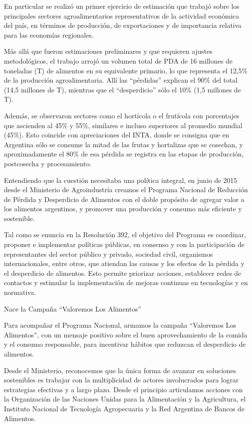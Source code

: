 En particular se realizó un primer ejercicio de estimación que trabajó
sobre los principales sectores agroalimentarios representativos de la
actividad económica del país, en términos de producción, de
exportaciones y de importancia relativa para las economías regionales.

Más allá que fueron estimaciones preliminares y que requieren ajustes
metodológicos, el trabajo arrojó un volumen total de PDA de 16 millones
de toneladas (T) de alimentos en su equivalente primario, lo que
representa el 12,5\% de la producción agroalimentaria. Allí las
``pérdidas'' explican el 90\% del total (14,5 millones de T), mientras
que el ``desperdicio'' sólo el 10\% (1,5 millones de T).

Además, se observaron sectores como el hortícola o el frutícola con
porcentajes que ascienden al 45\% y 55\%, similares e incluso superiores
al promedio mundial (45\%). Esto coincide con apreciaciones del INTA,
donde se consigna que en Argentina sólo se consume la mitad de las
frutas y hortalizas que se cosechan, y aproximadamente el 80\% de esa
pérdida se registra en las etapas de producción, postcosecha y
procesamiento.

Entendiendo que la cuestión necesitaba una política integral, en junio
de 2015 desde el Ministerio de Agroindustria creamos el Programa
Nacional de Reducción de Pérdida y Desperdicio de Alimentos con el doble
propósito de agregar valor a los alimentos argentinos, y promover una
producción y consumo más eficiente y sostenible.

Tal como se enuncia en la Resolución 392, el objetivo del Programa es
coordinar, proponer e implementar políticas públicas, en consenso y con
la participación de representantes del sector público y privado,
sociedad civil, organismos internacionales, entre otros, que atiendan
las causas y los efectos de la pérdida y el desperdicio de alimentos.
Esto permite priorizar acciones, establecer redes de contactos y
estimular la implementación de mejoras continuas en tecnologías y en
normativa.

Nace la Campaña ``Valoremos Los Alimentos''

Para acompañar el Programa Nacional, armamos la campaña ``Valoremos Los
Alimentos'', con un mensaje positivo sobre el buen aprovechamiento de la
comida y el consumo responsable, para incentivar hábitos que reduzcan el
desperdicio de alimentos.

Desde el Ministerio, reconocemos que la única forma de avanzar en
soluciones sostenibles es trabajar con la multiplicidad de actores
involucrados para lograr estrategias efectivas y a largo plazo. Desde el
principio articulamos acciones con la Organización de las Naciones
Unidas para la Alimentación y la Agricultura, el Instituto Nacional de
Tecnología Agropecuaria y la Red Argentina de Bancos de Alimentos.

